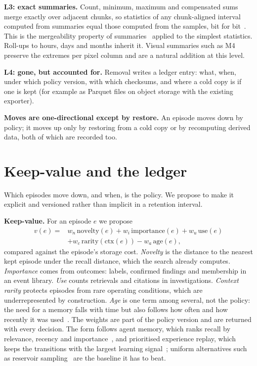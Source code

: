 \documentclass[sigconf,nonacm]{acmart}
\begin{document}
\textbf{L3: exact summaries.} Count, minimum, maximum and compensated sums merge exactly over adjacent chunks, so statistics of any chunk-aligned interval computed from summaries equal those computed from the samples, bit for bit~\cite{cs1}. This is the mergeability property of summaries~\cite{agarwal2013mergeable} applied to the simplest statistics. Roll-ups to hours, days and months inherit it. Visual summaries such as M4~\cite{jugel2014m4} preserve the extremes per pixel column and are a natural addition at this level.

\textbf{L4: gone, but accounted for.} Removal writes a ledger entry: what, when, under which policy version, with which checksums, and where a cold copy is if one is kept (for example as Parquet files on object storage with the existing exporter).

\textbf{Moves are one-directional except by restore.} An episode moves down by policy; it moves up only by restoring from a cold copy or by recomputing derived data, both of which are recorded too.

\section{Keep-value and the ledger}\label{sec:keep}
Which episodes move down, and when, is the policy. We propose to make it explicit and versioned rather than implicit in a retention interval.

\textbf{Keep-value.} For an episode $e$ we propose
\begin{align*}
v(e) ={}& w_n\,\mathrm{novelty}(e) + w_i\,\mathrm{importance}(e) + w_u\,\mathrm{use}(e)\\
&+ w_c\,\mathrm{rarity}(\mathrm{ctx}(e)) - w_a\,\mathrm{age}(e),
\end{align*}
compared against the episode's storage cost. \emph{Novelty} is the distance to the nearest kept episode under the recall distance, which the search already computes. \emph{Importance} comes from outcomes: labels, confirmed findings and membership in an event library. \emph{Use} counts retrievals and citations in investigations. \emph{Context rarity} protects episodes from rare operating conditions, which are underrepresented by construction. \emph{Age} is one term among several, not the policy: the need for a memory falls with time but also follows how often and how recently it was used~\cite{anderson1991}. The weights are part of the policy version and are returned with every decision. The form follows agent memory, which ranks recall by relevance, recency and importance~\cite{park2023generative}, and prioritised experience replay, which keeps the transitions with the largest learning signal~\cite{schaul2016per}; uniform alternatives such as reservoir sampling~\cite{vitter1985} are the baseline it has to beat.
\end{document}
